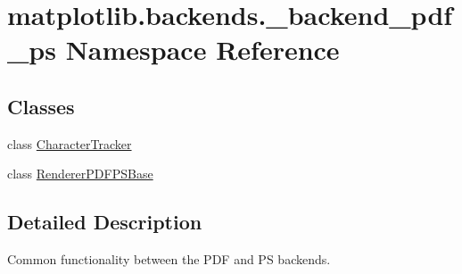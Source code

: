 \hypertarget{namespacematplotlib_1_1backends_1_1__backend__pdf__ps}{}\section{matplotlib.\+backends.\+\_\+backend\+\_\+pdf\+\_\+ps Namespace Reference}
\label{namespacematplotlib_1_1backends_1_1__backend__pdf__ps}
\subsection*{Classes}
\begin{DoxyCompactItemize}
\item 
class \hyperlink{classmatplotlib_1_1backends_1_1__backend__pdf__ps_1_1CharacterTracker}{Character\+Tracker}
\item 
class \hyperlink{classmatplotlib_1_1backends_1_1__backend__pdf__ps_1_1RendererPDFPSBase}{Renderer\+P\+D\+F\+P\+S\+Base}
\end{DoxyCompactItemize}


\subsection{Detailed Description}
\begin{DoxyVerb}Common functionality between the PDF and PS backends.
\end{DoxyVerb}
 